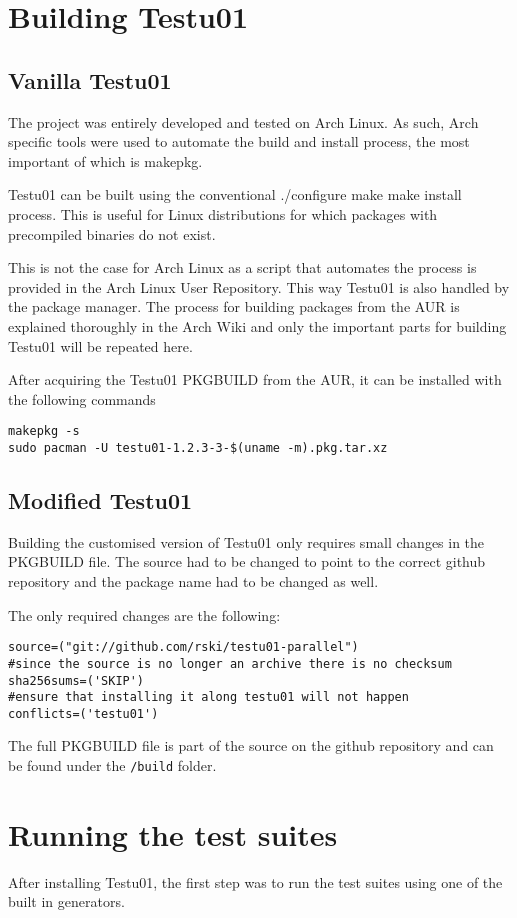 \section{Building Testu01}
\subsection{Vanilla Testu01}
The project was entirely developed and tested on Arch Linux. As such, Arch specific tools were used to automate the build and install process, the most important of which is makepkg.

Testu01 can be built using the conventional ./configure make make install process. This is useful for Linux distributions for which packages with precompiled binaries do not exist. 

This is not the case for Arch Linux as a script that automates the process is provided in the Arch Linux User Repository. This way Testu01 is also handled by the package manager. The process for building packages from the AUR is explained thoroughly in the Arch Wiki\cite{archwiki-aur} and only the important parts for building Testu01 will be repeated here.

After acquiring the Testu01 PKGBUILD from the AUR\cite{testu01-aur}, it can be installed with the following commands
\begin{verbatim}
makepkg -s
sudo pacman -U testu01-1.2.3-3-$(uname -m).pkg.tar.xz
\end{verbatim}

\subsection{Modified Testu01}
Building the customised version of Testu01 only requires small changes in the PKGBUILD file. The source had to be changed to point to the correct github repository and the package name had to be changed as well.

The only required changes are the following:
\begin{verbatim}
source=("git://github.com/rski/testu01-parallel")
#since the source is no longer an archive there is no checksum
sha256sums=('SKIP')
#ensure that installing it along testu01 will not happen
conflicts=('testu01')
\end{verbatim}

The full PKGBUILD file is part of the source on the github repository\cite{github-repo} and can be found under the \texttt{/build} folder.

\section{Running the test suites}
After installing Testu01, the first step was to run the test suites using one of the built in generators.

